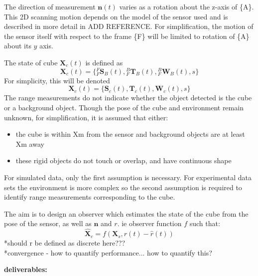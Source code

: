 The direction of measurement $\mathbf{n}(t)$ varies as a rotation about the z-axis of \{A\}. This 2D scanning motion depends on the model of the sensor used and is described in more detail in ADD REFERENCE. For simplification, the motion of the sensor itself with respect to the frame \{F\} will be limited to rotation of \{A\} about its $y$ axis.

The state of cube $\mathbf{X}_{c}(t)$ is defined as 
\begin{equation}
	\mathbf{X}_{c}(t) = 
	\{{^{F}_{F}\mathbf{S}^{}_{B}(t)},{^{B}_{F}\mathbf{T}^{}_{B}(t)},{^{B}_{F}\mathbf{W}^{}_{B}(t)},
	s\}
\end{equation}
For simplicity, this will be denoted
\begin{equation}
	\mathbf{X}_{c}(t) = 
	\{\mathbf{S}_{c}(t),\mathbf{T}_{c}(t),\mathbf{W}_{c}(t),s\}
\end{equation}
The range measurements do not indicate whether the object detected is the cube or a background object. Though the pose of the cube and environment remain unknown, for simplification, it is assumed that either:
\begin{itemize}
\item the cube is within Xm from the sensor and background objects are at least Xm away
\item these rigid objects do not touch or overlap, and have continuous shape
\end{itemize}
For simulated data, only the first assumption is necessary. For experimental data sets the environment is more complex so the second assumption is required to identify range measurements corresponding to the cube. 

The aim is to design an observer which estimates the state of the cube from the pose of the sensor, as well as $\mathbf{n}$ and $r$. ie observer function $f$ such that:
\begin{equation}
	\hat{\mathbf{X}}_{c} = f(\mathbf{X}_{s},r(t)-\hat{r}(t))
\end{equation}
*should r be defined as discrete here???\\
*convergence - how to quantify performance... how to quantify this?









\textbf{deliverables:} \\

